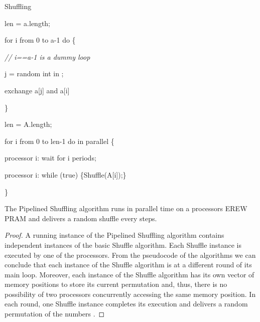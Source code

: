 \documentclass[letterpaper,10pt]{llncs}
\newenvironment{localscope}{}{}
\newcommand{\cw}[1]{}
\newcommand{\hla}[1]{\hl{#1}}
\renewcommand{\hla}[1]{#1}
\begin{document}
\begin{localscope}
\begin{algorithm}
\caption{Shuffling}
\label{alg:shuffle}
\begin{algorithmic}[1]
\cw{2cm}

len = a.length;

for i from 0 to a-1 do \{ 

\hspace{0,5cm} \textit{// i==a-1 is a dummy loop}

\hspace{0,5cm}      j = random int in ; 

\hspace{0,5cm}       exchange a[j] and a[i]

\} 

\EndProcedure

\end{algorithmic}

\begin{algorithmic}[1]
\cw{2cm}

len = A.length;

for i from 0 to len-1 do in parallel \{ 

\hspace{0,5cm}      processor i: wait for i periods;

\hspace{0,5cm}      processor i: while (true) \{Shuffle(A[i]);\} 

\}
\EndProcedure
\end{algorithmic}
\end{algorithm}
\end{localscope}


\begin{lemma}
\label{lem:shuffle}
The Pipelined Shuffling algorithm runs in  parallel time on a  processors EREW PRAM
and delivers a random shuffle every  steps.
\end{lemma}

\begin{proof}
\hla{A running instance of the Pipelined Shuffling algorithm contains  independent instances
of the basic Shuffle algorithm. 
Each Shuffle instance is executed by one of the  processors.
From the pseudocode of the algorithms we can conclude that
each instance of the Shuffle algorithm is at a different round of its main loop.
Moreover, each instance of the Shuffle 
algorithm has its own vector of  memory positions
to store its current permutation and, thus, there is no possibility of two processors 
concurrently accessing the same memory position. In each round, one Shuffle instance completes its execution and delivers a random permutation of the  numbers .}
\end{proof}
\end{document}
